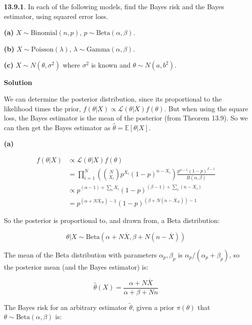 \textbf{13.9.1}. In each of the following models, find the Bayes risk
and the Bayes estimator, using squared error loss.

\textbf{(a)} \(X \sim \text{Binomial}(n, p)\),
\(p \sim \text{Beta}(\alpha, \beta)\).

\textbf{(b)} \(X \sim \text{Poisson}(\lambda)\),
\(\lambda \sim \text{Gamma}(\alpha, \beta)\).

\textbf{(c)} \(X \sim N(\theta, \sigma^{2})\) where \(\sigma^{2}\) is known
and \(\theta \sim N(a, b^{2})\).

\textbf{Solution}

We can determine the posterior distribution, since its proportional to
the likelihood times the prior,
\(f(\theta | X) \propto \mathcal{L}(\theta | X) f(\theta)\). But when
using the square loss, the Bayes estimator is the mean of the posterior
(from Theorem 13.9). So we can then get the Bayes estimator as
\(\hat{\theta} = \mathbb{E}[\theta | X]\).

\textbf{(a)}

\begin{align*}
f(\theta | X) &\propto \mathcal{L}(\theta | X) f(\theta) \\
&= \prod_{i = 1}^N \left( \binom{N}{X_{i}} p^{X_{i}}(1 - p)^{n - X_{i}} \right) \frac{p^{\alpha - 1}(1-p)^{\beta - 1}}{B(\alpha, \beta)} \\
& \propto p^{(\alpha - 1) + \sum_{i} X_{i}} (1 - p)^{(\beta - 1) + \sum_{i} (n - X_{i})} \\
&= p^{\left(\alpha + N \overline{X}_N \right) - 1} (1 - p)^{\left(\beta + N(n - \overline{X}_N) \right)- 1}
\end{align*}

So the posterior is proportional to, and drawn from, a Beta
distribution:

\[ \theta | X \sim \text{Beta}\left(\alpha + N \overline{X}, \beta + N(n - \overline{X}) \right)\]

The mean of the Beta distribution with parameters \(\alpha_p, \beta_p\)
is \(\alpha_p / (\alpha_p + \beta_p)\), so the posterior mean (and the
Bayes estimator) is:

\[ \hat{\theta}(X) = \frac{\alpha + N \overline{X}}{\alpha + \beta + Nn} \]

The Bayes risk for an arbitrary estimator \(\tilde{\theta}\), given a
prior \(\pi(\theta)\) that \(\theta \sim \text{Beta}(\alpha, \beta)\)
is:

